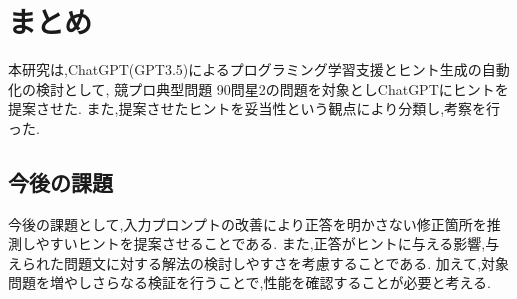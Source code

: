 \chapter{まとめ}
本研究は,ChatGPT(GPT3.5)によるプログラミング学習支援とヒント生成の自動化の検討として,
競プロ典型問題 90問星2の問題を対象としChatGPTにヒントを提案させた.
また,提案させたヒントを妥当性という観点により分類し,考察を行った.\\

\section{今後の課題}
今後の課題として,入力プロンプトの改善により正答を明かさない修正箇所を推測しやすいヒントを提案させることである.
また,正答がヒントに与える影響,与えられた問題文に対する解法の検討しやすさを考慮することである.
加えて,対象問題を増やしさらなる検証を行うことで,性能を確認することが必要と考える.
